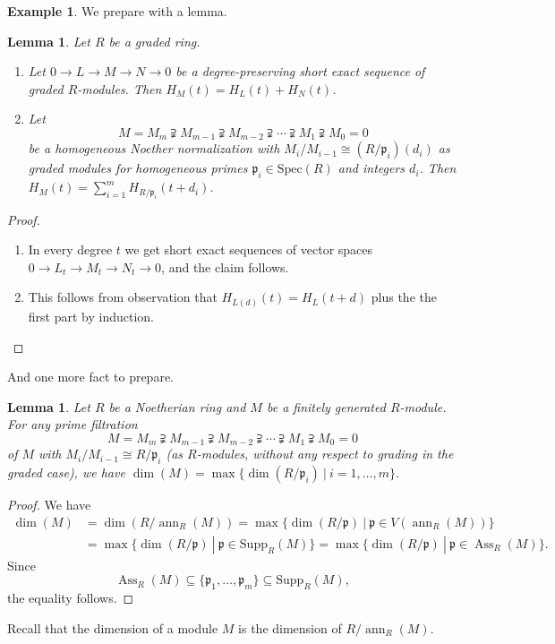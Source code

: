 \documentclass{amsart}[12pt]
\def\Ass{\operatorname{Ass}}
\def\ann{\operatorname{ann}}
\newcommand{\p}{{\mathfrak p}}
\numberwithin{equation}{section}
\theoremstyle{plain} %
\newtheorem{lem}[equation]{Lemma}
\newtheorem{lemma}[equation]{Lemma}
\theoremstyle{definition}
\newtheorem{ex}[equation]{Example}
\theoremstyle{remark}
\newcommand{\Spec}{\mathrm{Spec}}
\newcommand{\Supp}{\mathrm{Supp}}
\begin{document}
\begin{ex}
We prepare with a lemma.

\begin{lemma} Let $R$ be a graded ring. 
\begin{enumerate}
\item Let $0 \to L \to M \to N \to 0$
	be a degree-preserving short exact sequence of graded $R$-modules. Then $H_M(t)=H_L(t)+H_N(t)$.
	\item Let \[ M=M_m \supsetneqq M_{m-1} \supsetneqq M_{m-2} \supsetneqq \cdots \supsetneqq  M_1 \supsetneqq M_0 = 0 \] be a homogeneous Noether normalization
 with $M_i / M_{i-1} \cong (R/\p_i)(d_i)$ as graded modules for homogeneous primes $\p_i\in \Spec(R)$ and integers $d_i$. Then $H_M(t) = \sum_{i=1}^m H_{R/\p_i}(t + d_i)$.
 \end{enumerate}
\end{lemma}
\begin{proof}
\begin{enumerate}
\item	In every degree $t$ we get short exact sequences of vector spaces $0 \to L_t \to M_t \to N_t \to 0$, and the claim follows.
\item This follows from observation that $H_{L(d)}(t) =H_L(t+d)$ plus the the first part by induction.\qedhere
\end{enumerate}
\end{proof}

And one more fact to prepare.
\begin{lem} Let $R$ be a Noetherian ring and $M$ be a finitely generated $R$-module. For any prime filtration
\[ M=M_m \supsetneqq M_{m-1} \supsetneqq M_{m-2} \supsetneqq \cdots \supsetneqq  M_1 \supsetneqq M_0 = 0 \] 
of $M$ with $M_i/M_{i-1} \cong R/\p_i$ (as $R$-modules, without any respect to grading in the graded case), we have $\dim(M) = \max\{\dim(R/\p_i) \ | \ i=1,\dots,m\}.$
\end{lem}
\begin{proof}
We have \[\begin{aligned}  \dim(M) &= \dim(R/\ann_R(M)) = \max\{ \dim(R/\p) \ | \ \p\in V(\ann_R(M))\}\\&=\max\{ \dim(R/\p) \ | \ \p\in \Supp_R(M)\} = \max\{ \dim(R/\p) \ | \ \p\in \Ass_R(M)\}.\end{aligned}\]
Since \[ \Ass_R(M) \subseteq \{ \p_1,\dots,\p_m\} \subseteq \Supp_R(M),\]
the equality follows.
\end{proof}

Recall that the dimension of a module $M$ is the dimension of $R/\ann_R(M)$.


\end{ex}
\end{document}
